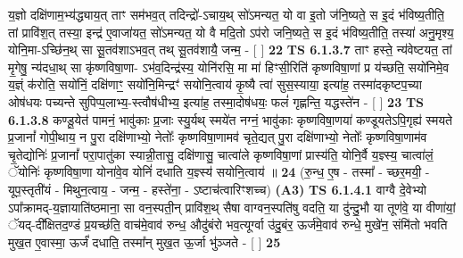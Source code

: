 \documentclass[17pt]{extarticle}
\begin{document}
                  य॒ज्ञो दक्षि॑णाम॒भ्य॑द्ध्याय॒त् ताꣳ सम॑भव॒त् तदिन्द्रो॑-ऽचाय॒थ् सो॑ऽमन्यत॒ यो वा इ॒तो ज॑नि॒ष्यते॒ स इ॒दं भ॑विष्य॒तीति॒ तां प्रावि॑श॒त् तस्या॒ इन्द्र॑ ए॒वाजा॑यत॒ सो॑ऽमन्यत॒ यो वै मदि॒तो ऽप॑रो जनि॒ष्यते॒ स इ॒दं भ॑विष्य॒तीति॒ तस्या॑ अनु॒मृश्य॒ योनि॒मा-ऽच्छि॑न॒थ् सा सू॒तव॑शाऽभव॒त् तथ् सू॒तव॑शायै॒ जन्म॒ - [  ] \textbf{  22} \newline
                  \newline
                                \textbf{ TS 6.1.3.7} \newline
                  ताꣳ हस्ते॒ न्य॑वेष्टयत॒ तां मृ॒गेषु॒ न्य॑दधा॒थ् सा कृ॑ष्णविषा॒णा- ऽभ॑व॒दिन्द्र॑स्य॒ योनि॑रसि॒ मा मा॑ हिꣳसी॒रिति॑ कृष्णविषा॒णां प्र य॑च्छति॒ सयो॑निमे॒व य॒ज्ञ्ं क॑रोति॒ सयो॑निं॒ दक्षि॑णाꣳ॒॒ सयो॑नि॒मिन्द्रꣳ॑ सयोनि॒त्वाय॑ कृ॒ष्यै त्वा॑ सुस॒स्याया॒ इत्या॑ह॒ तस्मा॑दकृष्टप॒च्या ओष॑धयः पच्यन्ते सुपिप्प॒लाभ्य॒-स्त्वौष॑धीभ्य॒ इत्या॑ह॒ तस्मा॒दोष॑धयः॒ फलं॑ गृह्णन्ति॒ यद्धस्ते॑न - [  ] \textbf{  23} \newline
                  \newline
                                \textbf{ TS 6.1.3.8} \newline
                  कण्डू॒येत॑ पामनं॒ भावु॑काः प्र॒जाः स्यु॒र्यथ् स्मये॑त नग्नं॒ भावु॑काः कृष्णविषा॒णया॑ कण्डूयतेऽपि॒गृह्य॑ स्मयते प्र॒जानां᳚ गोपी॒थाय॒ न पु॒रा दक्षि॑णाभ्यो॒ नेतोः᳚ कृष्णविषा॒णामव॑ चृते॒द्यत् पु॒रा दक्षि॑णाभ्यो॒ नेतोः᳚ कृष्णविषा॒णाम॑व चृ॒तेद्योनिः॑ प्र॒जानां᳚ परा॒पातु॑का स्यान्नी॒तासु॒ दक्षि॑णासु॒ चात्वा॑ले कृष्णविषा॒णां प्रास्य॑ति॒ योनि॒र्वै य॒ज्ञ्स्य॒ चात्वा॑लं॒ ॅयोनिः॑ कृष्णविषा॒णा योना॑वे॒व योनिं॑ दधाति य॒ज्ञ्स्य॑ सयोनि॒त्वाय॑ ॥ \textbf{  24} \newline
                  \newline
                      (रु॒न्ध॒ ए॒ष - तस्मा᳚ - च्छर॒मयी॒ - यूप॒स्तृती॑यं - मिथुन॒त्वाय॒ - जन्म॒ - हस्ते॑ना॒ - ऽष्टाच॑त्वारिꣳशच्च)  \textbf{(A3)} \newline \newline
                                        \textbf{ TS 6.1.4.1} \newline
                  वाग्वै दे॒वेभ्यो ऽपा᳚क्रामद्-य॒ज्ञायाति॑ष्ठमाना॒ सा वन॒स्पती॒न् प्रावि॑श॒थ् सैषा वाग्वन॒स्पति॑षु वदति॒ या दु॑न्दु॒भौ या तूण॑वे॒ या वीणा॑यां॒ ॅयद्-दी᳚क्षितद॒ण्डं प्र॒यच्छ॑ति॒ वाच॑मे॒वाव॑ रुन्ध॒ औदु॑बंरो भव॒त्यूर्ग्वा उ॑दु॒बंर॒ ऊर्ज॑मे॒वाव॑ रुन्धे॒ मुखे॑न॒ संमि॑तो भवति मुख॒त ए॒वास्मा॒ ऊर्जं॑ दधाति॒ तस्मा᳚न् मुख॒त ऊ॒र्जा भु॑ञ्जते - [  ] \textbf{  25} \newline
                  \newline
\end{document}
